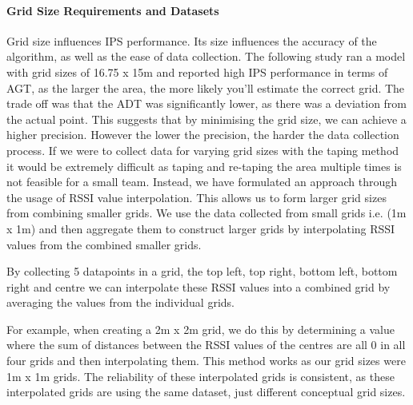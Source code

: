 \documentclass[runningheads]{llncs}
\begin{document}
\paragraph{Grid Size Requirements and Datasets} Grid size influences IPS performance. Its size influences the accuracy of the algorithm, as well as the ease of data collection. The following study \cite{LRE1} ran a model with grid sizes of 16.75 x 15m and reported high IPS performance in terms of AGT, as the larger the area, the more likely you’ll estimate the correct grid. The trade off was that the ADT was significantly lower, as there was a deviation from the actual point. This suggests that by minimising the grid size, we can achieve a higher precision. However the lower the precision, the harder the data collection process. 
If we were to collect data for varying grid sizes with the taping method it would be extremely difficult as taping and re-taping the area multiple times is not feasible for a small team. Instead, we have formulated an approach through the usage of RSSI value interpolation. This allows us to form larger grid sizes from combining smaller grids. We use the data collected from small grids i.e. (1m x 1m) and then aggregate them to construct larger grids by interpolating RSSI values from the combined smaller grids.

By collecting 5 datapoints in a grid, the top left, top right, bottom left, bottom right and centre we can interpolate these RSSI values into a combined grid by averaging the values from the individual grids.

For example, when creating a 2m x 2m grid, we do this by determining a value where the sum of distances between the RSSI values of the centres are all 0 in all four grids and then interpolating them. This method works as our grid sizes were 1m x 1m grids. The reliability of these interpolated grids is consistent, as these interpolated grids are using the same dataset, just different conceptual grid sizes.
\end{document}
